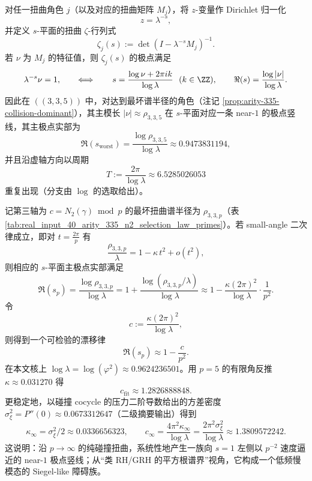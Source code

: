 \begin{remark}\label{rem:arity-335-near1-pole-line}
对任一扭曲角色 \(j\)（以及对应的扭曲矩阵 \(M_j\)），将 \(z\)-变量作 Dirichlet 归一化
\[
z=\lambda^{-s},
\]
并定义 \(s\)-平面的扭曲 \(\zeta\)-行列式
\[
\zeta_j(s):=\det(I-\lambda^{-s}M_j)^{-1}.
\]
若 \(\nu\) 为 \(M_j\) 的特征值，则 \(\zeta_j(s)\) 的极点满足
\[
\lambda^{-s}\nu=1,
\qquad\Longleftrightarrow\qquad
s=\frac{\log \nu+2\pi i k}{\log\lambda}\ \ (k\in\ZZ),
\qquad
\Re(s)=\frac{\log|\nu|}{\log\lambda}.
\]
因此在 \(((3,3,5))\) 中，对达到最坏谱半径的角色（注记 \ref{prop:arity-335-collision-dominant}），其主模长 \(|\nu|\approx \rho_{3,3,5}\) 在 \(s\)-平面对应一条 near-\(1\) 的极点竖线，其主极点实部为
$$
\Re(s_{\mathrm{worst}})=\frac{\log\rho_{3,3,5}}{\log\lambda}\approx 0.9473831194,
$$
并且沿虚轴方向以周期
$$
T:=\frac{2\pi}{\log\lambda}\approx 6.5285026053
$$
重复出现（分支由 \(\log\) 的选取给出）。
\end{remark}

\begin{remark}\label{rem:arity-335-near1-pole-drift}
记第三轴为 \(c=N_2(\gamma)\bmod p\) 的最坏扭曲谱半径为 \(\rho_{3,3,p}\)（表 \ref{tab:real_input_40_arity_335_n2_selection_law_primes}）。若 small-angle 二次律成立，即对 \(t=\frac{2\pi}{p}\) 有
\[
\frac{\rho_{3,3,p}}{\lambda}=1-\kappa\,t^2+o(t^2),
\]
则相应的 \(s\)-平面主极点实部满足
\[
\Re(s_p)
=\frac{\log\rho_{3,3,p}}{\log\lambda}
=1+\frac{\log(\rho_{3,3,p}/\lambda)}{\log\lambda}
\approx 1-\frac{\kappa(2\pi)^2}{\log\lambda}\cdot\frac{1}{p^2}.
\]
令
\[
c:=\frac{\kappa(2\pi)^2}{\log\lambda},
\]
则得到一个可检验的漂移律
$$
\Re(s_p)\approx 1-\frac{c}{p^2}.
$$
在本文核上 \(\log\lambda=\log(\varphi^2)\approx 0.9624236501\)。用 \(p=5\) 的有限角反推 \(\kappa\approx 0.031270\) 得
\[
c_{\mathrm{fit}}\approx 1.2826888848.
\]
更稳定地，以碰撞 cocycle 的压力二阶导数给出的方差密度 \(\sigma_\xi^2=P''(0)\approx 0.0673312647\)（二级摘要输出）得到
\[
\kappa_\infty=\sigma_\xi^2/2\approx 0.0336656323,
\qquad
c_\infty=\frac{4\pi^2\kappa_\infty}{\log\lambda}=\frac{2\pi^2\sigma_\xi^2}{\log\lambda}\approx 1.3809572242.
\]
这说明：沿 \(p\to\infty\) 的纯碰撞扭曲，系统性地产生一族向 \(s=1\) 左侧以 \(p^{-2}\) 速度逼近的 near-\(1\) 极点竖线；从“类 RH/GRH 的平方根谱界”视角，它构成一个低频慢模态的 Siegel-like 障碍族。
\end{remark}

